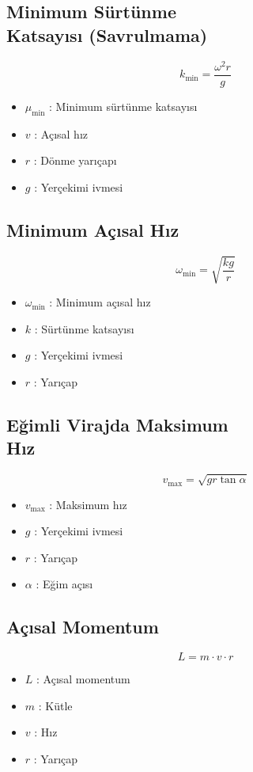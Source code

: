 \documentclass[a4paper, 11pt, titlepage]{article}
\begin{document}
\subsection[Minimum Sürtünme Katsayısı]{Minimum Sürtünme \\Katsayısı (Savrulmama)}
\[
k_{\mathrm{min}} = \frac{\omega^2 r}{g}
\]
\begin{itemize}
  \item $\mu_{\mathrm{min}}$ : Minimum sürtünme katsayısı
  \item $v$ : Açısal hız
  \item $r$ : Dönme yarıçapı
  \item $g$ : Yerçekimi ivmesi
\end{itemize}

\subsection{Minimum Açısal Hız}
\[
\omega_{\mathrm{min}} = \sqrt{\frac{k g}{r}}
\]
\begin{itemize}
  \item $\omega_{\mathrm{min}}$ : Minimum açısal hız
  \item $k$ : Sürtünme katsayısı
  \item $g$ : Yerçekimi ivmesi
  \item $r$ : Yarıçap
\end{itemize}

\subsection[Eğimli Virajda Maksimum Hız]{Eğimli Virajda Maksimum \\ Hız}
\[
v_{\mathrm{max}} = \sqrt{g r \tan \alpha}
\]
\begin{itemize}
  \item $v_{\mathrm{max}}$ : Maksimum hız
  \item $g$ : Yerçekimi ivmesi
  \item $r$ : Yarıçap
  \item $\alpha$ : Eğim açısı
\end{itemize}

\subsection{Açısal Momentum}
\[
L = m \cdot v \cdot r
\]
\begin{itemize}
  \item $L$ : Açısal momentum
  \item $m$ : Kütle
  \item $v$ : Hız
  \item $r$ : Yarıçap
\end{itemize}
\end{document}

